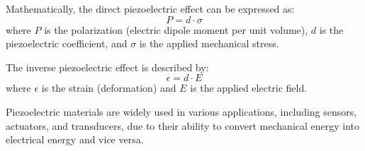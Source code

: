 Mathematically, the direct piezoelectric effect can be expressed as:
\[ P = d \cdot \sigma \]
where \( P \) is the polarization (electric dipole moment per unit volume), \( d \) is the piezoelectric coefficient, and \( \sigma \) is the applied mechanical stress.

The inverse piezoelectric effect is described by:
\[ \epsilon = d \cdot E \]
where \( \epsilon \) is the strain (deformation) and \( E \) is the applied electric field.

Piezoelectric materials are widely used in various applications, including sensors, actuators, and transducers, due to their ability to convert mechanical energy into electrical energy and vice versa.

